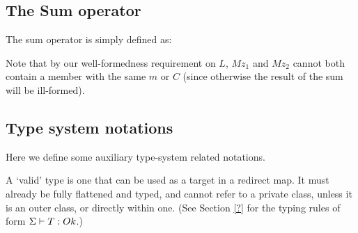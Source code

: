 \subsection{The Sum operator}
The sum operator is simply defined as:

\begin{defs}
{}
{}
\end{defs}
Note that by our well-formedness requirement on $L$, $Mz_1$ and $Mz_2$ cannot both contain a member with the same $m$ or $C$ (since otherwise the result of the sum will be ill-formed).

\subsection{Type system notations}
Here we define some auxiliary type-system related notations.

A `valid' type is one that can be used as a target in a redirect map. It must already be fully flattened and typed, and cannot refer to a private class, unless it is an outer class, or directly within one. (See Section \ref{?} for the typing rules of form $\Sigma \vdash T : {Ok}$.)

\begin{defs}
	
\end{defs}

